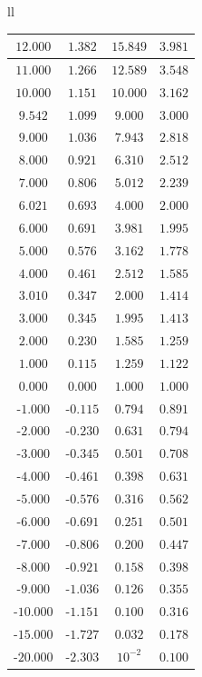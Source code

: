 \begin{tabular}{ll}
{\begin{tabular}{|c|c|c|c|}
			\textbf{$12.000$} & $1.382$ & $15.849$ & $3.981$ \\ \hline
			$11.000$ & $1.266$ & $12.589$ & $3.548$ \\ \hline
			\textbf{$10.000$} & $1.151$ & \textbf{$10.000$} & $3.162$ \\ \hline
			$9.542$ & $1.099$ & $9.000$ & $3.000$ \\ \hline
			$9.000$ & $1.036$ & $7.943$ & $2.818$ \\ \hline
			$8.000$ & $0.921$ & $6.310$ & $2.512$ \\ \hline
			$7.000$ & $0.806$ & $5.012$ & $2.239$ \\ \hline
			\textbf{$6.021$} & \textbf{$0.693$} & \textbf{$4.000$} & \textbf{$2.000$} \\ \hline
			$6.000$ & $0.691$ & $3.981$ & $1.995$ \\ \hline
			$5.000$ & $0.576$ & $3.162$ & $1.778$ \\ \hline
			$4.000$ & $0.461$ & $2.512$ & $1.585$ \\ \hline
			\textbf{$3.010$} & \textbf{$0.347$} & \textbf{$2.000$} & \textbf{$1.414$} \\ \hline
			$3.000$ & $0.345$ & $1.995$ & $1.413$ \\ \hline
			$2.000$ & $0.230$ & $1.585$ & $1.259$ \\ \hline
			$1.000$ & $0.115$ & $1.259$ & $1.122$ \\ \hline
			$0.000$ & $0.000$ & $1.000$ & $1.000$ \\ \hline
			-$1.000$ & -$0.115$ & $0.794$ & $0.891$ \\ \hline
			-$2.000$ & -$0.230$ & $0.631$ & $0.794$ \\ \hline
			-$3.000$ & -$0.345$ & $0.501$ & $0.708$ \\ \hline
			-$4.000$ & -$0.461$ & $0.398$ & $0.631$ \\ \hline
			-$5.000$ & -$0.576$ & $0.316$ & $0.562$ \\ \hline
			-$6.000$ & -$0.691$ & $0.251$ & $0.501$ \\ \hline
			-$7.000$ & -$0.806$ & $0.200$ & $0.447$ \\ \hline
			-$8.000$ & -$0.921$ & $0.158$ & $0.398$ \\ \hline
			-$9.000$ & -$1.036$ & $0.126$ & $0.355$ \\ \hline
			-$10.000$ & -$1.151$ & $0.100$ & $0.316$ \\ \hline
			-$15.000$ & -$1.727$ & $0.032$ & $0.178$ \\ \hline
			-$20.000$ & -$2.303$ & $10^{-2}$ & $0.100$ \\ \hline

\end{tabular}}
\end{tabular}
